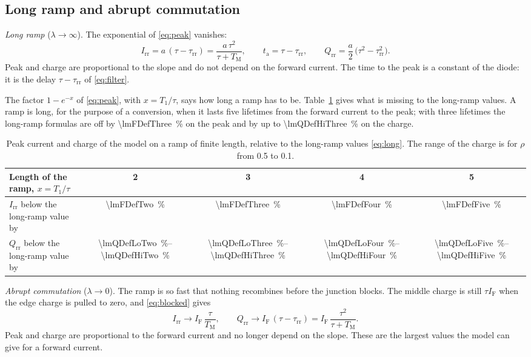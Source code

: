 \documentclass[10pt,a4paper]{scrartcl}
\newcommand{\IF}{I_\mathrm{F}}
\newcommand{\Irr}{I_\mathrm{rr}}
\newcommand{\Qrr}{Q_\mathrm{rr}}
\newcommand{\ta}{t_\mathrm{a}}
\newcommand{\taurr}{\tau_\mathrm{rr}}
\newcommand{\TM}{T_\mathrm{M}}
\newcommand{\Tone}{T_1}
\begin{document}
\subsection{Long ramp and abrupt commutation}
\label{sec:limitsramp}
\emph{Long ramp} ($\lambda \to \infty$). The exponential of \eqref{eq:peak} vanishes:
\begin{equation}
\Irr = a\,(\tau - \taurr) = \frac{a\,\tau^2}{\tau+\TM} , \qquad \ta = \tau - \taurr , \qquad \Qrr = \frac{a}{2}\,\bigl(\tau^2 - \taurr^2\bigr) .
\label{eq:long}
\end{equation}
Peak and charge are proportional to the slope and do not depend on the forward current. The time to the peak is a constant of the diode: it is the delay $\tau - \taurr$ of \eqref{eq:filter}.

The factor $1 - e^{-x}$ of \eqref{eq:peak}, with $x = \Tone/\tau$, says how long a ramp has to be. Table~\ref{tab:long} gives what is missing to the long-ramp values. A ramp is long, for the purpose of a conversion, when it lasts five lifetimes from the forward current to the peak; with three lifetimes the long-ramp formulas are off by \SI{\lmFDefThree}{\percent} on the peak and by up to \SI{\lmQDefHiThree}{\percent} on the charge.

\begin{table}[htb]
\centering\small
\caption{Peak current and charge of the model on a ramp of finite length, relative to the long-ramp values \eqref{eq:long}. The range of the charge is for $\rho$ from 0.5 to 0.1.}
\label{tab:long}
\begin{tabular}{@{}lcccc@{}}
\toprule
Length of the ramp, $x = \Tone/\tau$ & 2 & 3 & 4 & 5 \\
\midrule
$\Irr$ below the long-ramp value by & \SI{\lmFDefTwo}{\percent} & \SI{\lmFDefThree}{\percent} & \SI{\lmFDefFour}{\percent} & \SI{\lmFDefFive}{\percent} \\
$\Qrr$ below the long-ramp value by & \SIrange{\lmQDefLoTwo}{\lmQDefHiTwo}{\percent} & \SIrange{\lmQDefLoThree}{\lmQDefHiThree}{\percent} & \SIrange{\lmQDefLoFour}{\lmQDefHiFour}{\percent} & \SIrange{\lmQDefLoFive}{\lmQDefHiFive}{\percent} \\
\bottomrule
\end{tabular}
\end{table}

\emph{Abrupt commutation} ($\lambda \to 0$). The ramp is so fast that nothing recombines before the junction blocks. The middle charge is still $\tau\IF$ when the edge charge is pulled to zero, and \eqref{eq:blocked} gives
\begin{equation}
\Irr \to \IF\,\frac{\tau}{\TM} , \qquad \Qrr \to \IF\,(\tau - \taurr) = \IF\,\frac{\tau^2}{\tau+\TM} .
\label{eq:abrupt}
\end{equation}
Peak and charge are proportional to the forward current and no longer depend on the slope. These are the largest values the model can give for a forward current.
\end{document}

